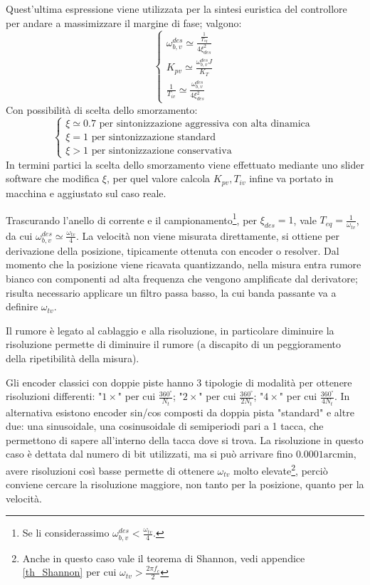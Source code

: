 Quest'ultima espressione viene utilizzata per la sintesi euristica del controllore per andare a massimizzare il margine di fase; valgono:\label{Teq}
\[
\begin{cases}
    \omega_{b,v}^{des} \simeq \frac{\frac{1}{T_{eq}}}{4\xi^2_{des}} \\
    K_{pv} \simeq \frac{\omega_{b,v}^{des}J}{K_T} \\
    \frac{1}{T_{iv}} \simeq \frac{\omega_{b,v}^{des}}{4\xi^2_{des}}
\end{cases}
\]
Con possibilità di scelta dello smorzamento:
\[
\begin{cases}
    \xi \simeq 0.7 \text{ \ per sintonizzazione aggressiva con alta dinamica } \\
    \xi = 1 \text{ \ per sintonizzazione standard} \\
    \xi > 1 \text{ \ per sintonizzazione conservativa}
\end{cases}
\]
In termini partici la scelta dello smorzamento viene effettuato mediante uno slider software che modifica \(\xi\), per quel valore calcola \(K_{pv}, T_{iv}\) infine va portato in macchina e aggiustato sul caso reale.

Trascurando l'anello di corrente e il campionamento\footnote{Se li considerassimo \(\omega_{b,v}^{des} < \frac{\omega_{tv}}{4}\).}, per \(\xi_{des}=1\), vale \(T_{eq}=\frac{1}{\omega_{tv}}\), da cui \(\omega_{b,v}^{des}\simeq \frac{\omega_{tv}}{4}\).
La velocità non viene misurata direttamente, si ottiene per derivazione della posizione, tipicamente ottenuta con encoder o resolver. Dal momento che la posizione viene ricavata quantizzando, nella misura entra rumore bianco con componenti ad alta frequenza che vengono amplificate dal derivatore; risulta necessario applicare un filtro passa basso, la cui banda passante va a definire \(\omega_{tv}\).

Il rumore è legato al cablaggio e alla risoluzione, in particolare diminuire la risoluzione permette di diminuire il rumore (a discapito di un peggioramento della ripetibilità della misura). 

Gli encoder classici con doppie piste hanno 3 tipologie di modalità per ottenere risoluzioni differenti: "\(1\times\)" per cui \(\frac{360^\circ}{N_t}\); "\(2\times\)" per cui \(\frac{360^\circ}{2N_t}\); "\(4\times\)" per cui \(\frac{360^\circ}{4N_t}\).
In alternativa esistono encoder sin/cos composti da doppia pista "standard" e altre due: una sinusoidale, una cosinusoidale di semiperiodi pari a 1 tacca, che permettono di sapere all'interno della tacca dove si trova. La risoluzione in questo caso è dettata dal numero di bit utilizzati, ma si può arrivare fino \(0.0001 \text{arcmin}\), avere risoluzioni così basse permette di ottenere \(\omega_{tv}\) molto elevate\footnote{Anche in questo caso vale il teorema di Shannon, vedi appendice \ref{th_Shannon} per cui \(\omega_{tv}>\frac{2\pi f_c}{2}\)}, perciò conviene cercare la risoluzione maggiore, non tanto per la posizione, quanto per la velocità.

